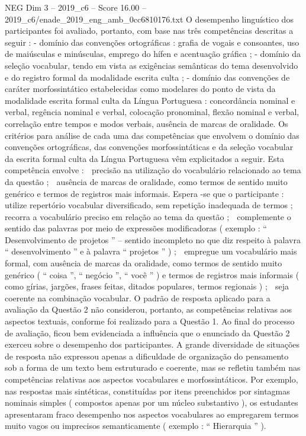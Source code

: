 \begin{textsample}{NEG Dim 3 – 2019\_c6 – Score 16.00 – 2019\_c6/enade\_2019\_eng\_amb\_0cc6810176.txt}
O desempenho linguístico dos participantes foi avaliado, portanto, com base nas três competências descritas a seguir : - domínio das convenções ortográficas : grafia de vogais e consoantes, uso de maiúsculas e minúsculas, emprego do hífen e acentuação gráfica ; - domínio da seleção vocabular, tendo em vista as exigências semânticas do tema desenvolvido e do registro formal da modalidade escrita culta ; - domínio das convenções de caráter morfossintático estabelecidas como modelares do ponto de vista da modalidade escrita formal culta da Língua Portuguesa : concordância nominal e verbal, regência nominal e verbal, colocação pronominal, flexão nominal e verbal, correlação entre tempos e modos verbais, ausência de marcas de oralidade.
Os critérios para análise de cada uma das competências que envolvem o domínio das convenções ortográficas, das convenções morfossintáticas e da seleção vocabular da escrita formal culta da Língua Portuguesa vêm explicitados a seguir.
Esta competência envolve :  precisão na utilização do vocabulário relacionado ao tema da questão ;  ausência de marcas de oralidade, como termos de sentido muito genérico e termos de registros mais informais.
Espera -se que o participante :  utilize repertório vocabular diversificado, sem repetição inadequada de termos ;  recorra a vocabulário preciso em relação ao tema da questão ;  complemente o sentido das palavras por meio de expressões modificadoras ( exemplo : “ Desenvolvimento de projetos ” – sentido incompleto no que diz respeito à palavra “ desenvolvimento ” e à palavra “ projetos ” ) ;  empregue um vocabulário mais formal, com ausência de marcas da oralidade, como termos de sentido muito genérico ( “ coisa ”, “ negócio ”, “ você ” ) e termos de registros mais informais ( como gírias, jargões, frases feitas, ditados populares, termos regionais ) ;  seja coerente na combinação vocabular.
O padrão de resposta aplicado para a avaliação da Questão 2 não considerou, portanto, as competências relativas aos aspectos textuais, conforme foi realizado para a Questão 1.
Ao final do processo de avaliação, ficou bem evidenciada a influência que o enunciado da Questão 2 exerceu sobre o desempenho dos participantes.
A grande diversidade de situações de resposta não expressou apenas a dificuldade de organização do pensamento sob a forma de um texto bem estruturado e coerente, mas se refletiu também nas competências relativas aos aspectos vocabulares e morfossintáticos.
Por exemplo, nas respostas mais sintéticas, constituídas por itens preenchidos por sintagmas nominais simples ( compostos apenas por um núcleo substantivo ), os estudantes apresentaram fraco desempenho nos aspectos vocabulares ao empregarem termos muito vagos ou imprecisos semanticamente ( exemplo : “ Hierarquia ” ).

\end{textsample}
